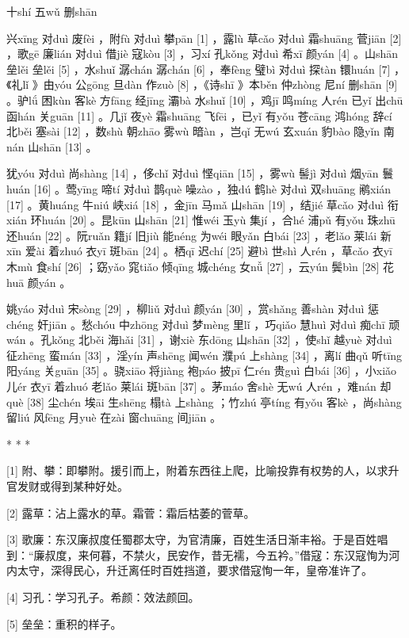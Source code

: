 \documentclass[12pt,UTF8]{ctexbook}
\begin{document}
十shí 五wǔ 删shān


兴xīng 对duì 废fèi ，附fù 对duì 攀pān [1] ，露lù 草cǎo 对duì 霜shuāng 菅jiān [2] ，歌gē 廉lián 对duì 借jiè 寇kòu [3] ，习xí 孔kǒng 对duì 希xī 颜yán [4] 。山shān 垒lěi 垒lěi [5] ，水shuǐ 潺chán 潺chán [6] ，奉fèng 璧bì 对duì 探tàn 镮huán [7] ，《礼lǐ 》由yóu 公gōng 旦dàn 作zuò [8] ，《诗shī 》本běn 仲zhòng 尼ní 删shān [9] 。驴lǘ 困kùn 客kè 方fāng 经jīng 灞bà 水shuǐ [10] ，鸡jī 鸣míng 人rén 已yǐ 出chū 函hán 关guān [11] 。几jǐ 夜yè 霜shuāng 飞fēi ，已yǐ 有yǒu 苍cāng 鸿hóng 辞cí 北běi 塞sài [12] ，数shù 朝zhāo 雾wù 暗àn ，岂qǐ 无wú 玄xuán 豹bào 隐yǐn 南nán 山shān [13] 。

犹yóu 对duì 尚shàng [14] ，侈chǐ 对duì 悭qiān [15] ，雾wù 髻jì 对duì 烟yān 鬟huán [16] 。莺yīng 啼tí 对duì 鹊què 噪zào ，独dú 鹤hè 对duì 双shuāng 鹇xián [17] 。黄huáng 牛niú 峡xiá [18] ，金jīn 马mǎ 山shān [19] ，结jié 草cǎo 对duì 衔xián 环huán [20] 。昆kūn 山shān [21] 惟wéi 玉yù 集jí ，合hé 浦pǔ 有yǒu 珠zhū 还huán [22] 。阮ruǎn 籍jí 旧jiù 能néng 为wéi 眼yǎn 白bái [23] ，老lǎo 莱lái 新xīn 爱ài 着zhuó 衣yī 斑bān [24] 。栖qī 迟chí [25] 避bì 世shì 人rén ，草cǎo 衣yī 木mù 食shí [26] ；窈yǎo 窕tiǎo 倾qīng 城chéng 女nǚ [27] ，云yún 鬓bìn [28] 花huā 颜yán 。

姚yáo 对duì 宋sòng [29] ，柳liǔ 对duì 颜yán [30] ，赏shǎng 善shàn 对duì 惩chéng 奸jiān 。愁chóu 中zhōng 对duì 梦mèng 里lǐ ，巧qiǎo 慧huì 对duì 痴chī 顽wán 。孔kǒng 北běi 海hǎi [31] ，谢xiè 东dōng 山shān [32] ，使shǐ 越yuè 对duì 征zhēng 蛮mán [33] ，淫yín 声shēng 闻wén 濮pú 上shàng [34] ，离lí 曲qǔ 听tīng 阳yáng 关guān [35] 。骁xiāo 将jiàng 袍páo 披pī 仁rén 贵guì 白bái [36] ，小xiǎo 儿ér 衣yī 着zhuó 老lǎo 莱lái 斑bān [37] 。茅máo 舍shè 无wú 人rén ，难nán 却què [38] 尘chén 埃āi 生shēng 榻tà 上shàng ；竹zhú 亭tíng 有yǒu 客kè ，尚shàng 留liú 风fēng 月yuè 在zài 窗chuāng 间jiān 。



* * *



[1] 附、攀：即攀附。援引而上，附着东西往上爬，比喻投靠有权势的人，以求升官发财或得到某种好处。

[2] 露草：沾上露水的草。霜菅：霜后枯萎的菅草。

[3] 歌廉：东汉廉叔度任蜀郡太守，为官清廉，百姓生活日渐丰裕。于是百姓唱到：“廉叔度，来何暮，不禁火，民安作，昔无襦，今五衿。”借寇：东汉寇恂为河内太守，深得民心，升迁离任时百姓挡道，要求借寇恂一年，皇帝准许了。

[4] 习孔：学习孔子。希颜：效法颜回。

[5] 垒垒：重积的样子。
\end{document}
